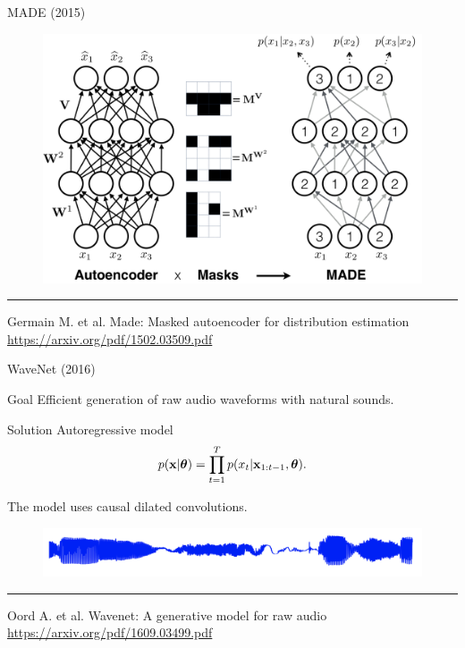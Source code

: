 \begin{frame}{MADE (2015)}
\begin{figure}
    \centering
    \includegraphics[width=0.9\linewidth]{figs/made.png}
    \label{fig:made}
\end{figure}
\vfill
\hrule\medskip
{\scriptsize Germain M. et al. Made: Masked autoencoder for distribution estimation \href{https://arxiv.org/pdf/1502.03509.pdf}{https://arxiv.org/pdf/1502.03509.pdf}}
\end{frame}
\begin{frame}{WaveNet (2016)}
\begin{block}{Goal}
Efficient generation of raw audio waveforms with natural sounds.
\end{block}
\begin{block}{Solution}
Autoregressive model
\[
    p(\mathbf{x}| \boldsymbol{\theta}) = \prod_{t=1}^T p(x_t|\mathbf{x}_{1:t-1}, \boldsymbol{\theta}).
\]
\end{block}
The model uses causal dilated convolutions.
\begin{figure}
    \centering
    \includegraphics[width=0.9\linewidth]{figs/wavenet_ex.png}
\end{figure}
\vfill
\hrule\medskip
{\scriptsize Oord A. et al. Wavenet: A generative model for raw audio \href{https://arxiv.org/pdf/1609.03499.pdf}{https://arxiv.org/pdf/1609.03499.pdf}}
\end{frame}

